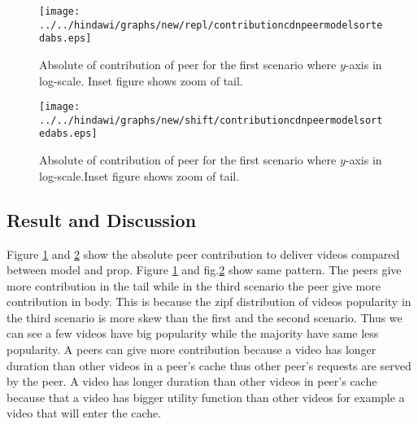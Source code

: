 \begin{figure}[!t]
\begin{center}
\texttt{[image: ../../hindawi/graphs/new/repl/contributioncdnpeermodelsortedabs.eps]}
\end{center}
\caption{Absolute of contribution of peer for the first scenario where $y$-axis in log-scale. Inset figure shows zoom of tail.}
\label{fig:contribu-normal}
\end{figure} 


\begin{figure}[!t]
\begin{center}
\texttt{[image: ../../hindawi/graphs/new/shift/contributioncdnpeermodelsortedabs.eps]}
\end{center}
\caption{Absolute of contribution of peer for the first scenario where $y$-axis in log-scale.Inset figure shows zoom of tail.}
\label{fig:contribu-shift}
\end{figure} 






\subsection{Result and Discussion}\label{resultanddiscussion}
Figure \ref{fig:contribu-normal} and \ref{fig:contribu-shift} show the absolute peer contribution to deliver videos compared between model and prop. 
Figure \ref{fig:contribu-normal} and fig.\ref{fig:contribu-shift} show same pattern.
The peers give more contribution in the tail while in the third scenario the peer give more contribution in body. 
This is because the zipf distribution of videos popularity in the third scenario is more skew than the first and the second scenario. Thus we can see a few videos have big popularity while the majority have same less popularity. 
A peers can give more contribution because a video has longer duration than other videos in a peer's cache thus other peer's requests are served by the peer. 
A video has longer duration than other videos in peer's cache because that a video has bigger utility function than other videos for example a video that will enter the cache. 


